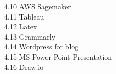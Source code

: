 \documentclass[11pt,journal,compsoc]{IEEEtran}
\begin{document}
4.10 AWS Sagemaker \\
4.11 Tableau \\
4.12 Latex \\
4.13 Grammarly \\
4.14 Wordpress for blog \\
4.15 MS Power Point Presentation \\
4.16 Draw.io \\
\end{document}
